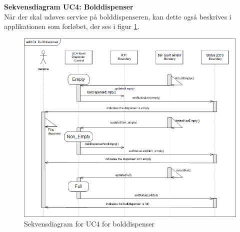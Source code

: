 \documentclass[Arkitektur/System_main.tex]{subfiles}
\begin{document}
\textbf{Sekvensdiagram UC4: Bolddispenser}\\
Når der skal udøves service på bolddispenseren, kan dette også beskrives i applikationen som forløbet, der ses i figur \ref{fig:seq_uc4_balldispenser}.
\begin{figure}[H]
    \centering
    \includegraphics[width=\textwidth]{Arkitektur/Softwarearkitektur/Applikationsmodel/BallDispenser/graphicsBallDispenser/ApplikationsmodelBolddispensersequc4.png}
    \caption{Sekvensdiagram for UC4 for bolddispenser}
    \label{fig:seq_uc4_balldispenser}
\end{figure}
\newpage
\end{document}
